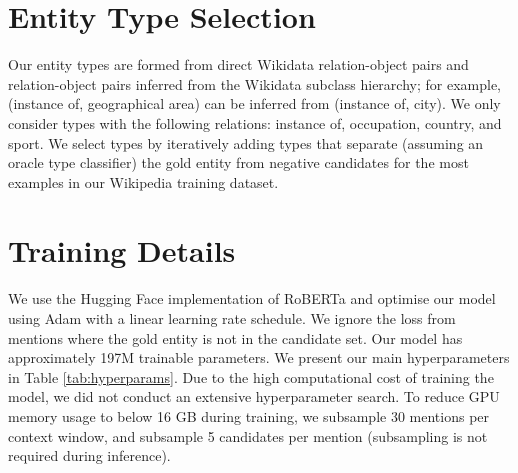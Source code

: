 \documentclass[11pt]{article}
\begin{document}
\appendix


\section{Entity Type Selection}
\label{sec:model-details}
Our entity types are formed from direct Wikidata relation-object pairs and relation-object pairs inferred from the Wikidata subclass hierarchy; for example, (instance of, geographical area) can be inferred from (instance of, city). We only consider types with the following relations: instance of, occupation, country, and sport. We select types by iteratively adding types that separate (assuming an oracle type classifier) the gold entity from negative candidates for the most examples in our Wikipedia training dataset.


\section{Training Details}
\label{sec:training-details}
We use the Hugging Face implementation of RoBERTa \cite{huggingface} and optimise our model using Adam \cite{adam} with a linear learning rate schedule. We ignore the loss from mentions where the gold entity is not in the candidate set. Our model has approximately 197M trainable parameters. We present our main hyperparameters in Table \ref{tab:hyperparams}. Due to the high computational cost of training the model, we did not conduct an extensive hyperparameter search. To reduce GPU memory usage to below 16 GB during training, we subsample 30 mentions per context window, and subsample 5 candidates per mention (subsampling is not required during inference).
\end{document}
